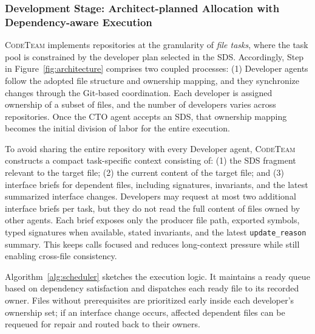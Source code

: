\documentclass[format=acmsmall, review=false, screen=true]{acmart}
\newcommand{\tool}{\textsc{CodeTeam}\xspace}
\begin{document}
\subsubsection{Development Stage: Architect-planned Allocation with Dependency-aware Execution}
\tool implements repositories at the granularity of \emph{file tasks}, where the task pool is constrained by the developer plan selected in the SDS. Accordingly, Step~ in Figure~\ref{fig:architecture} comprises two coupled processes: (1) Developer agents follow the adopted file structure and ownership mapping, and they synchronize changes through the Git-based coordination. Each developer is assigned ownership of a subset of files, and the number of developers varies across repositories. Once the CTO agent accepts an SDS, that ownership mapping becomes the initial division of labor for the entire execution.

To avoid sharing the entire repository with every Developer agent, \tool constructs a compact task-specific context consisting of: (1) the SDS fragment relevant to the target file; (2) the current content of the target file; and (3) interface briefs for dependent files, including signatures, invariants, and the latest summarized interface changes. Developers may request at most two additional interface briefs per task, but they do not read the full content of files owned by other agents. Each brief exposes only the producer file path, exported symbols, typed signatures when available, stated invariants, and the latest \texttt{update\_reason} summary. This keeps calls focused and reduces long-context pressure while still enabling cross-file consistency.

Algorithm~\ref{alg:scheduler} sketches the execution logic.
It maintains a ready queue based on dependency satisfaction and dispatches each ready file to its recorded owner.
Files without prerequisites are prioritized early inside each developer's ownership set; if an interface change occurs, affected dependent files can be requeued for repair and routed back to their owners.
\end{document}
